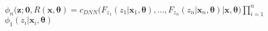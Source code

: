 \documentclass[preview]{standalone}
\begin{document}
\begin{center}
$\phi_n(\boldsymbol{z}; \boldsymbol{0}, R(\boldsymbol{x}, \boldsymbol{\theta})$$ = $$c_{DNN}(F_{z_1}(z_1 | \boldsymbol{x}_1, \boldsymbol{\theta}), \ldots,  F_{z_n}(z_n | \boldsymbol{x}_n, \boldsymbol{\theta})$$| \boldsymbol{x}, \boldsymbol{\theta})$$\prod_{i=1}^n $$\phi_{1}(z_i| \boldsymbol{x}_i, \boldsymbol{\theta})$
\end{center}
\end{document}
